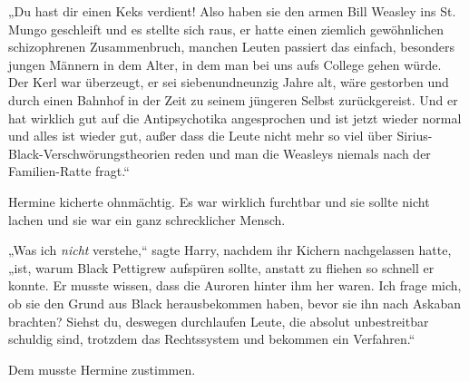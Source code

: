 „Du hast dir einen Keks verdient! Also haben sie den armen Bill Weasley ins St. Mungo geschleift und es stellte sich raus, er hatte einen ziemlich gewöhnlichen schizophrenen Zusammenbruch, manchen Leuten passiert das einfach, besonders jungen Männern in dem Alter, in dem man bei uns aufs College gehen würde. Der Kerl war überzeugt, er sei siebenundneunzig Jahre alt, wäre gestorben und durch einen Bahnhof in der Zeit zu seinem jüngeren Selbst zurückgereist. Und er hat wirklich gut auf die Antipsychotika angesprochen und ist jetzt wieder normal und alles ist wieder gut, außer dass die Leute nicht mehr so viel über Sirius-Black-Verschwörungstheorien reden und man die Weasleys niemals nach der Familien-Ratte fragt.“

Hermine kicherte ohnmächtig. Es war wirklich furchtbar und sie sollte nicht lachen und sie war ein ganz schrecklicher Mensch.

„Was ich \emph{nicht} verstehe,“ sagte Harry, nachdem ihr Kichern nachgelassen hatte, „ist, warum Black Pettigrew aufspüren sollte, anstatt zu fliehen so schnell er konnte. Er musste wissen, dass die Auroren hinter ihm her waren. Ich frage mich, ob sie den Grund aus Black herausbekommen haben, bevor sie ihn nach Askaban brachten? Siehst du, deswegen durchlaufen Leute, die absolut unbestreitbar schuldig sind, trotzdem das Rechtssystem und bekommen ein Verfahren.“

Dem musste Hermine zustimmen.


